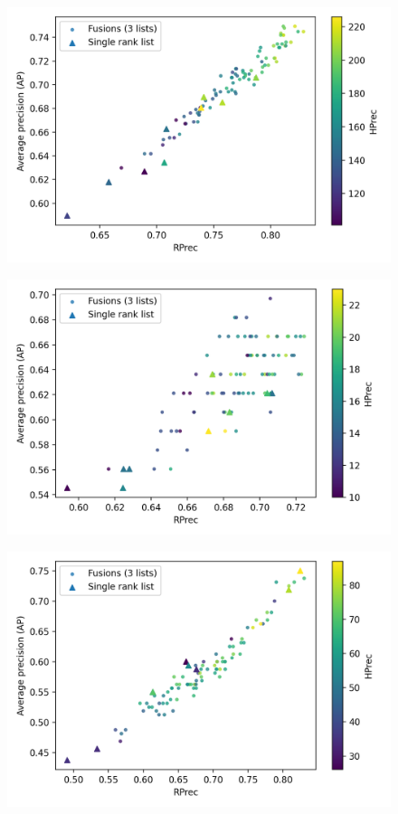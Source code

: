 \begin{figure}
  \includegraphics[width=\linewidth]{img/fusion_st_jean.png}
  \caption{}
  \label{fig:fusion_st_jean}
\end{figure}
\begin{figure}
  \includegraphics[width=\linewidth]{img/fusion_brunet.png}
  \caption{}
  \label{fig:fusion_brunet}
\end{figure}
\begin{figure}
  \includegraphics[width=\linewidth]{img/fusion_oxquarry.png}
  \caption{}
  \label{fig:fusion_oxquarry}
\end{figure}
